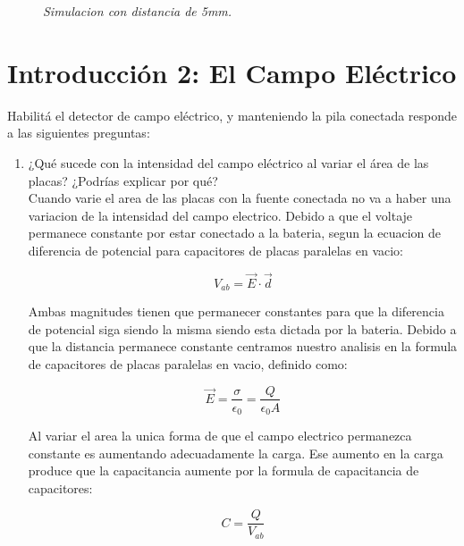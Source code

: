 \documentclass[12pt]{report}
\begin{document}
\begin{enumerate}
\begin{figure}[h]
\begin{minipage}[h]{0.45\textwidth}
        \textit{Simulacion con distancia de 5mm.} 
     \end{minipage}
    \end{figure}

\end{enumerate}

\newpage

\section{Introducción 2: El Campo Eléctrico}

Habilitá el detector de campo eléctrico, y manteniendo la pila conectada responde a las siguientes preguntas:\\[6pt]
\begin{enumerate}
    \item ¿Qué sucede con la intensidad del campo eléctrico al variar el área de las placas? ¿Podrías explicar por qué?\\[6pt]
    Cuando varie el area de las placas con la fuente conectada no va a haber una variacion de la intensidad del campo electrico. Debido a que el voltaje permanece constante por estar conectado a la bateria, segun la ecuacion de diferencia de potencial para capacitores de placas paralelas en vacio:

    \[V_{ab}=\vec{E} \cdot \vec{d}\]

    Ambas magnitudes tienen que permanecer constantes para que la diferencia de potencial siga siendo la misma siendo esta dictada por la bateria. Debido a que la distancia permanece constante centramos nuestro analisis en la formula de capacitores de placas paralelas en vacio, definido como:

    \[\vec{E}=\frac{\sigma}{\epsilon_0}=\frac{Q}{\epsilon_0 A}\]

    Al variar el area la unica forma de que el campo electrico permanezca constante es aumentando adecuadamente la carga. Ese aumento en la carga produce que la capacitancia aumente por la formula de capacitancia de capacitores:

    \[C=\frac{Q}{V_{ab}}\]


\end{enumerate}
\end{document}
